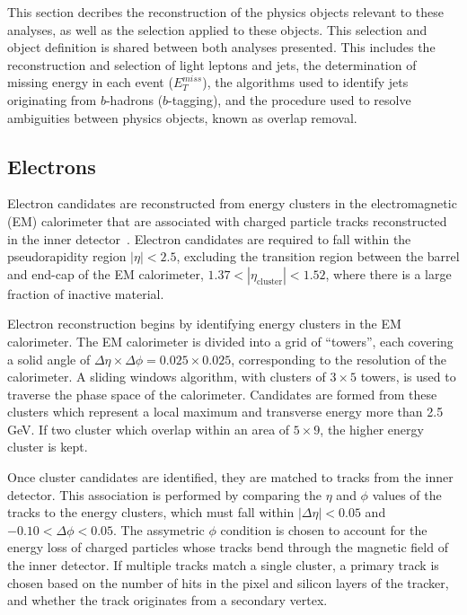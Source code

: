 
This section decribes the reconstruction of the physics objects relevant to these analyses, as well as the selection applied to these objects. This selection and object definition is shared between both analyses presented. This includes the reconstruction and selection of light leptons and jets, the determination of missing energy in each event ($E_T^{miss}$), the algorithms used to identify jets originating from $b$-hadrons ($b$-tagging), and the procedure used to resolve ambiguities between physics objects, known as overlap removal.

\subsection{Electrons}
\label{obj:ele}

Electron candidates are reconstructed from energy clusters in the electromagnetic (EM) calorimeter that are associated with charged particle tracks reconstructed in the inner detector~\cite{ATLAS-CONF-2016-024}. Electron candidates are required to fall within the pseudorapidity region $|\eta| < 2.5$, excluding the transition region between the barrel and end-cap of the EM calorimeter, $1.37 < |\eta_\textrm{cluster}| < 1.52$, where there is a large fraction of inactive material. 

Electron reconstruction begins by identifying energy clusters in the EM calorimeter. The EM calorimeter is divided into a grid of ``towers'', each covering a solid angle of $\Delta\eta\times\Delta\phi = 0.025\times 0.025$, corresponding to the resolution of the calorimeter. A sliding windows algorithm, with clusters of $3\times 5$ towers, is used to traverse the phase space of the calorimeter. Candidates are formed from these clusters which represent a local maximum and transverse energy more than 2.5 GeV. If two cluster which overlap within an area of $5\times 9$, the higher energy cluster is kept.

Once cluster candidates are identified, they are matched to tracks from the inner detector. This association is performed by comparing the $\eta$ and $\phi$ values of the tracks to the energy clusters, which must fall within $|\Delta\eta| < 0.05$ and $-0.10 < \Delta\phi < 0.05$. The assymetric $\phi$ condition is chosen to account for the energy loss of charged particles whose tracks bend through the magnetic field of the inner detector. If multiple tracks match a single cluster, a primary track is chosen based on the number of hits in the pixel and silicon layers of the tracker, and whether the track originates from a secondary vertex.

